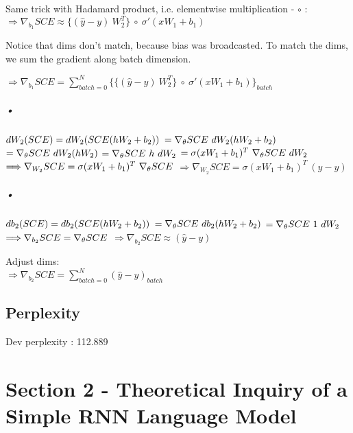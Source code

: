 \documentclass{article}
\begin{document}
Same trick with Hadamard product, i.e. elementwise multiplication - $\circ$ :\\
$\Longrightarrow \nabla_{b_1} SCE \approx \{ (\hat{y}-y) \ W_2^T \} \ \circ \ \sigma' (xW_1+b_1)$

Notice that dims don't match, because bias was broadcasted. To match the dims, we sum the gradient along batch dimension.

$\Longrightarrow \nabla_{b_1} SCE = \sum_{batch=0}^N \{ \{ (\hat{y}-y) \ W_2^T \} \ \circ \ \sigma' (xW_1+b_1)\} _{batch}$

\subparagraph{•}
$dW_2(SCE)=dW_2(SCE(hW_2+b_2)) \\$
$= \nabla_\theta SCE \ dW_2(hW_2+b_2) \\$
$= \nabla_\theta SCE \ dW_2(hW_2) \\$
$= \nabla_\theta SCE \ h \ dW_2 \\$
$= \sigma (xW_1+b_1)^T \ \nabla_\theta SCE \ dW_2 \\$
$\Longrightarrow \nabla_{W_2} SCE = \sigma (xW_1+b_1)^T \ \nabla_\theta SCE \\$
$\Longrightarrow \nabla_{W_2} SCE = \sigma (xW_1+b_1)^T \ (\hat{y}-y)$

\subparagraph{•}
$db_2(SCE)=db_2(SCE(hW_2+b_2)) \\$
$= \nabla_\theta SCE \ db_2(hW_2+b_2) \\$
$= \nabla_\theta SCE \ 1 \ dW_2 \\$
$\Longrightarrow \nabla_{b_2} SCE = \nabla_\theta SCE \\$
$\Longrightarrow \nabla_{b_2} SCE \approx (\hat{y}-y) $

Adjust dims:\\
$\Longrightarrow \nabla_{b_2} SCE = \sum_{batch=0}^N (\hat{y}-y)_{batch} $

\subsection{}

\subsection{Perplexity}
Dev perplexity : 112.889

\section*{Section 2 - Theoretical Inquiry of a Simple RNN Language Model}
\end{document}
